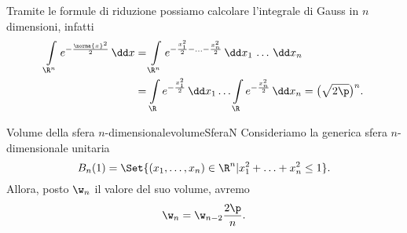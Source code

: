 \begin{oss}
	Tramite le formule di riduzione possiamo calcolare l'integrale di Gauss in \(n\) dimensioni, infatti
	\[
		\begin{split}
			\int\limits_{\R^n} e^{-\frac{\norma{x}^2}{2}}\,\dd x & = \int\limits_{\R^n}e^{-\frac{x_1^2}{2}-\ldots- \frac{x_n^2}{2}}\,\dd x_1\,\ldots\,\dd x_n\\
			& = \int\limits_\R e^{-\frac{x_1^2}{2}}\,\dd x_1 \ldots \int\limits_\R e^{-\frac{x_n^2}{2}}\,\dd x_n = \big(\sqrt{2\p}\big)^n.
		\end{split}
	\]
\end{oss}

\begin{prop}{Volume della sfera \(n\)-dimensionale}{volumeSferaN}
	Consideriamo la generica sfera \(n\)-dimensionale unitaria
	\[
		B_n(1) = \Set{(x_1,\ldots,x_n)\in\R^n | x_1^2+\ldots+x_n^2 \le 1}.
	\]
	Allora, posto \(\w_n\) il valore del suo volume, avremo
	\[
		\w_n = \w_{n-2} \frac{2\p}{n}.
	\]
\end{prop}

